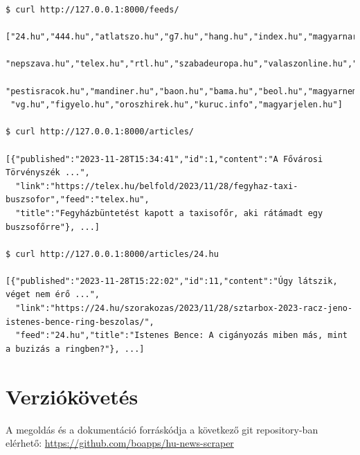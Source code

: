 \documentclass[]{article}
\begin{document}
\begin{verbatim}
$ curl http://127.0.0.1:8000/feeds/

["24.hu","444.hu","atlatszo.hu","g7.hu","hang.hu","index.hu","magyarnarancs.hu","mfor.hu",
 "nepszava.hu","telex.hu","rtl.hu","szabadeuropa.hu","valaszonline.hu","origo.hu",
 "pestisracok.hu","mandiner.hu","baon.hu","bama.hu","beol.hu","magyarnemzet.hu","hirtv.hu",
 "vg.hu","figyelo.hu","oroszhirek.hu","kuruc.info","magyarjelen.hu"]

$ curl http://127.0.0.1:8000/articles/

[{"published":"2023-11-28T15:34:41","id":1,"content":"A Fővárosi Törvényszék ...",
  "link":"https://telex.hu/belfold/2023/11/28/fegyhaz-taxi-buszsofor","feed":"telex.hu",
  "title":"Fegyházbüntetést kapott a taxisofőr, aki rátámadt egy buszsofőrre"}, ...]

$ curl http://127.0.0.1:8000/articles/24.hu

[{"published":"2023-11-28T15:22:02","id":11,"content":"Úgy látszik, véget nem érő ...",
  "link":"https://24.hu/szorakozas/2023/11/28/sztarbox-2023-racz-jeno-istenes-bence-ring-beszolas/",
  "feed":"24.hu","title":"Istenes Bence: A cigányozás miben más, mint a buzizás a ringben?"}, ...]
\end{verbatim}

\section{Verziókövetés}

A megoldás és a dokumentáció forráskódja a következő git repository-ban elérhető: \url{https://github.com/boapps/hu-news-scraper}
\end{document}
